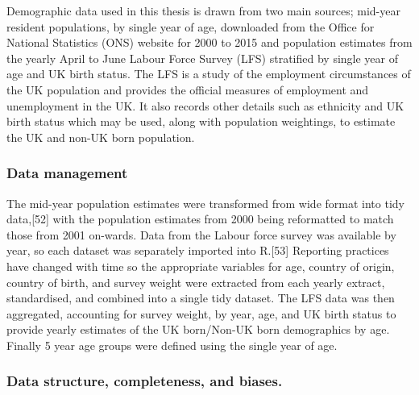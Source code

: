 \documentclass[11pt,twoside]{bristolthesis}
\begin{document}
  Demographic data used in this thesis is drawn from two main sources; mid-year resident populations, by single year of age, downloaded from the Office for National Statistics (ONS) website for 2000 to 2015 and population estimates from the yearly April to June Labour Force Survey (LFS) stratified by single year of age and UK birth status. The LFS is a study of the employment circumstances of the UK population and provides the official measures of employment and unemployment in the UK. It also records other details such as ethnicity and UK birth status which may be used, along with population weightings, to estimate the UK and non-UK born population.
  
  \hypertarget{data-management}{%
  \subsubsection{Data management}\label{data-management}}
  
  The mid-year population estimates were transformed from wide format into tidy data,{[}52{]} with the population estimates from 2000 being reformatted to match those from 2001 on-wards. Data from the Labour force survey was available by year, so each dataset was separately imported into R.{[}53{]} Reporting practices have changed with time so the appropriate variables for age, country of origin, country of birth, and survey weight were extracted from each yearly extract, standardised, and combined into a single tidy dataset. The LFS data was then aggregated, accounting for survey weight, by year, age, and UK birth status to provide yearly estimates of the UK born/Non-UK born demographics by age. Finally 5 year age groups were defined using the single year of age.
  
  \hypertarget{data-structure-completeness-and-biases.}{%
  \subsubsection{Data structure, completeness, and biases.}\label{data-structure-completeness-and-biases.}}
  
\end{document}

